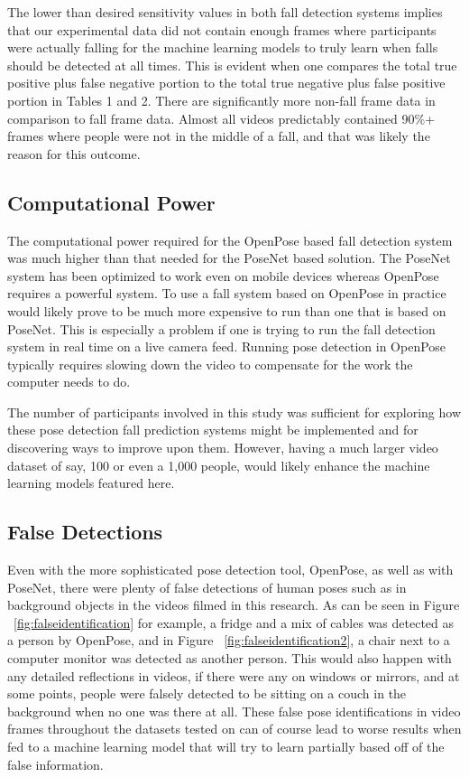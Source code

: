 The lower than desired sensitivity values in both fall detection systems implies that our experimental data did not contain enough frames where participants were actually falling for the machine learning models to truly learn when falls should be detected at all times. This is evident when one compares the total true positive plus false negative portion to the total true negative plus false positive portion in Tables 1 and 2. There are significantly more non-fall frame data in comparison to fall frame data. Almost all videos predictably contained 90\%+ frames where people were not in the middle of a fall, and that was likely the reason for this outcome.


\subsection{Computational Power}

The computational power required for the OpenPose based fall detection system was much higher than that needed for the PoseNet based solution. The PoseNet system has been optimized to work even on mobile devices whereas OpenPose requires a powerful system. To use a fall system based on OpenPose in practice would likely prove to be much more expensive to run than one that is based on PoseNet. This is especially a problem if one is trying to run the fall detection system in real time on a live camera feed. Running pose detection in OpenPose typically requires slowing down the video to compensate for the work the computer needs to do.

The number of participants involved in this study was sufficient for exploring how these pose detection fall prediction systems might be implemented and for discovering ways to improve upon them. However, having a much larger video dataset of say, 100 or even a 1,000 people, would likely enhance the machine learning models featured here.

\subsection{False Detections}
Even with the more sophisticated pose detection tool, OpenPose, as well as with PoseNet, there were plenty of false detections of human poses such as in background objects in the videos filmed in this research. As can be seen in Figure ~\ref{fig:falseidentification} for example, a fridge and a mix of cables was detected as a person by OpenPose, and in Figure ~\ref{fig:falseidentification2}, a chair next to a computer monitor was detected as another person. This would also happen with any detailed reflections in videos, if there were any on windows or mirrors, and at some points, people were falsely detected to be sitting on a couch in the background when no one was there at all. These false pose identifications in video frames throughout the datasets tested on can of course lead to worse results when fed to a machine learning model that will try to learn partially based off of the false information.


